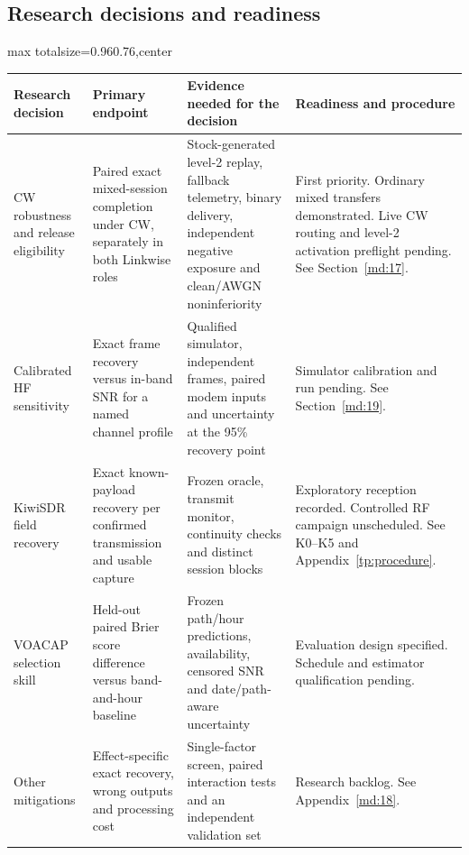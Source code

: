 \documentclass[11pt,a4paper]{article}
\newlength{\tableavail}
\renewcommand{\arraystretch}{1.13}
\begin{document}
\begin{landscape}\thispagestyle{plain}\centering
\subsection*{Research decisions and readiness}

\setlength{\tabcolsep}{5pt}\renewcommand{\arraystretch}{1.25}
\setlength{\tableavail}{\dimexpr\linewidth-6\tabcolsep\relax}
\begin{adjustbox}{max totalsize={0.96\linewidth}{0.76\textheight},center}
\begin{tabular}{@{}>{\raggedright\arraybackslash}p{0.17\tableavail}>{\raggedright\arraybackslash}p{0.25\tableavail}>{\raggedright\arraybackslash}p{0.3\tableavail}>{\raggedright\arraybackslash}p{0.28\tableavail}@{}}
\toprule
\textbf{Research decision} & \textbf{Primary endpoint} & \textbf{Evidence needed for the decision} & \textbf{Readiness and procedure}\\
\midrule
CW robustness and release eligibility & Paired exact mixed-session completion under CW, separately in both Linkwise roles & Stock-generated level-2 replay, fallback telemetry, binary delivery, independent negative exposure and clean/AWGN noninferiority & First priority. Ordinary mixed transfers demonstrated. Live CW routing and level-2 activation preflight pending. See Section~\ref{md:17}.\\[5pt]
Calibrated HF sensitivity & Exact frame recovery versus in-band SNR for a named channel profile & Qualified simulator, independent frames, paired modem inputs and uncertainty at the 95\% recovery point & Simulator calibration and run pending. See Section~\ref{md:19}.\\[5pt]
KiwiSDR field recovery & Exact known-payload recovery per confirmed transmission and usable capture & Frozen oracle, transmit monitor, continuity checks and distinct session blocks & Exploratory reception recorded. Controlled RF campaign unscheduled. See K0--K5 and Appendix~\ref{tp:procedure}.\\[5pt]
VOACAP selection skill & Held-out paired Brier score difference versus band-and-hour baseline & Frozen path/hour predictions, availability, censored SNR and date/path-aware uncertainty & Evaluation design specified. Schedule and estimator qualification pending.\\[5pt]
Other mitigations & Effect-specific exact recovery, wrong outputs and processing cost & Single-factor screen, paired interaction tests and an independent validation set & Research backlog. See Appendix~\ref{md:18}.\\[5pt]
\bottomrule
\end{tabular}
\end{adjustbox}
\end{landscape}
\end{document}
